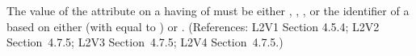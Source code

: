 The value of the  attribute on a \Compartment having
 of  must be either ,
, , or the identifier of a
\UnitDefinition based on either  (with  equal
to ) or .  (References: L2V1 Section 4.5.4;
L2V2 Section~4.7.5; L2V3 Section~4.7.5; L2V4 Section~4.7.5.)
